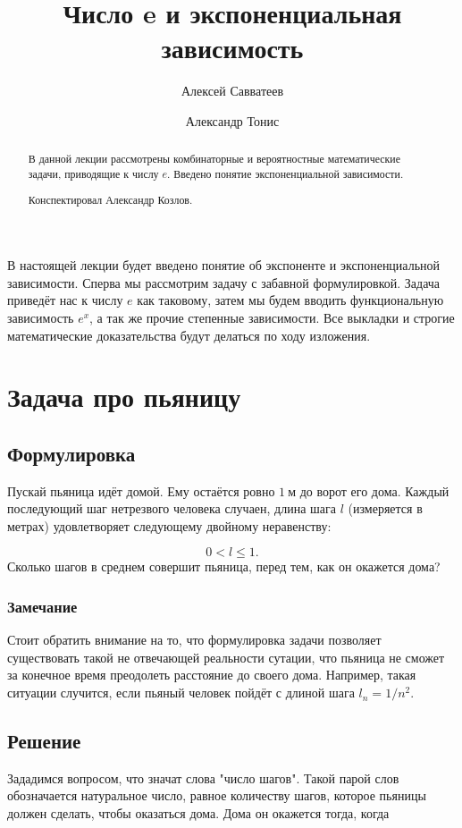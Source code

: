 \documentclass[12pt]{article}
\title{Число e и экспоненциальная зависимость}
\author{Алексей Савватеев \and Александр Тонис}
\begin{document}
\maketitle
\begin{abstract}
В данной лекции рассмотрены комбинаторные и вероятностные математические задачи, приводящие к числу $e$. Введено понятие экспоненциальной зависимости.
\par
Конспектировал Александр Козлов. 
\end{abstract}
\newpage
\tableofcontents
\newpage

В настоящей лекции будет введено понятие об экспоненте и экспоненциальной зависимости. Сперва мы рассмотрим задачу с забавной формулировкой. Задача приведёт нас к числу $e$ как таковому, затем мы будем вводить функциональную зависимость $e^x$, а так же прочие степенные зависимости. Все выкладки и строгие математические доказательства будут делаться по ходу изложения.

\section{Задача про пьяницу} %

\subsection{Формулировка} %
\label{sub:f}
Пускай пьяница идёт домой. Ему остаётся ровно $1\ \text{м}$ до ворот его дома. Каждый последующий шаг нетрезвого человека случаен, длина шага $l$ (измеряется в метрах) удовлетворяет следующему двойному неравенству:

\begin{equation}
	0 < l \le 1.
\end{equation}
Сколько шагов в среднем совершит пьяница, перед тем, как он окажется дома?

\subsubsection{Замечание} %
Стоит обратить внимание на то, что формулировка задачи позволяет существовать такой не отвечающей реальности сутации, что пьяница не сможет за конечное время преодолеть расстояние до своего дома. Например, такая ситуации случится, если пьяный человек пойдёт с длиной шага $l_n = {1}/{n^2}$.

\subsection{Решение} %
Зададимся вопросом, что значат слова "{}число шагов"{}. Такой парой слов обозначается натуральное число, равное количеству шагов, которое пьяницы должен сделать, чтобы оказаться дома. Дома он окажется тогда, когда 
\end{document}
